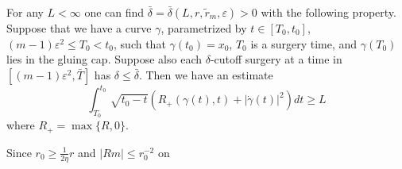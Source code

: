 \begin{lemma}
  \label{lem:cz-surgery-cap-reduced-length-barrier}
For any $L<\infty$ one can find
$\bar{\delta}=\bar{\delta}(L,r,\widetilde{r}_m,\varepsilon)>0$
with the following property. Suppose that we have a curve
$\gamma$, parametrized by $t\in[T_0,t_0]$, $(m-1)\varepsilon^2\leq
T_0<t_0$, such that $\gamma(t_0)=x_0$, $T_0$ is a surgery time,
and $\gamma(T_0)$ lies in the gluing cap. Suppose also each
$\delta$-cutoff surgery at a time in
$[(m-1)\varepsilon^2,\bar{T}]$ has $\delta \leq \bar{\delta}$.
Then we have an estimate \begin{equation}
\int^{t_0}_{T_0}\sqrt{t_0-t}(R_+(\gamma(t),t)
+|\dot{\gamma}(t)|^2)dt\geq L  %
\end{equation} where $R_+=\max\{R,0\}$.

\medskip
Since $r_0\geq \frac{1}{2\eta}r$ and $|Rm|\leq r^{-2}_0$ on
\end{lemma}
